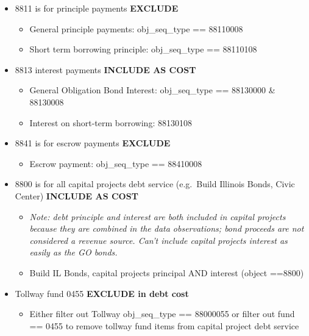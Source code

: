\documentclass[
  letterpaper,
  DIV=11,
  numbers=noendperiod]{scrreport}
\providecommand{\tightlist}{%
  \setlength{\itemsep}{0pt}\setlength{\parskip}{0pt}}\usepackage{longtable,booktabs,array}
\begin{document}
\begin{itemize}
\tightlist
\item
  8811 is for principle payments \textbf{EXCLUDE}

  \begin{itemize}
  \tightlist
  \item
    General principle payments: obj\_seq\_type == 88110008
  \item
    Short term borrowing principle: obj\_seq\_type == 88110108
  \end{itemize}
\item
  8813 interest payments \textbf{INCLUDE AS COST}

  \begin{itemize}
  \tightlist
  \item
    General Obligation Bond Interest: obj\_seq\_type == 88130000 \&
    88130008
  \item
    Interest on short-term borrowing: 88130108
  \end{itemize}
\item
  8841 is for escrow payments \textbf{EXCLUDE}

  \begin{itemize}
  \tightlist
  \item
    Escrow payment: obj\_seq\_type == 88410008
  \end{itemize}
\item
  8800 is for all capital projects debt service (e.g.~Build Illinois
  Bonds, Civic Center) \textbf{INCLUDE AS COST}

  \begin{itemize}
  \tightlist
  \item
    \emph{Note: debt principle and interest are both included in capital
    projects because they are combined in the data observations; bond
    proceeds are not considered a revenue source. Can't include capital
    projects interest as easily as the GO bonds.}
  \item
    Build IL Bonds, capital projects principal AND interest (object
    ==8800)
  \end{itemize}
\item
  Tollway fund 0455 \textbf{EXCLUDE in debt cost}

  \begin{itemize}
  \tightlist
  \item
    Either filter out Tollway obj\_seq\_type == 88000055 or filter out
    fund == 0455 to remove tollway fund items from capital project debt
    service
  \end{itemize}
\end{itemize}
\end{document}
